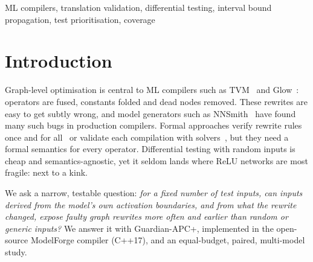 \documentclass[conference]{IEEEtran}
\begin{document}
\begin{IEEEkeywords}
ML compilers, translation validation, differential testing, interval bound propagation, test prioritisation, coverage
\end{IEEEkeywords}

\section{Introduction}
Graph-level optimisation is central to ML compilers such as TVM~\cite{tvm} and Glow~\cite{glow}: operators are fused, constants folded and dead nodes removed. These rewrites are easy to get subtly wrong, and model generators such as NNSmith~\cite{nnsmith} have found many such bugs in production compilers. Formal approaches verify rewrite rules once and for all~\cite{tensorright} or validate each compilation with solvers~\cite{necula,pnueli,alive2}, but they need a formal semantics for every operator. Differential testing with random inputs is cheap and semantics-agnostic, yet it seldom lands where ReLU networks are most fragile: next to a kink.

We ask a narrow, testable question: \emph{for a fixed number of test inputs, can inputs derived from the model's own activation boundaries, and from what the rewrite changed, expose faulty graph rewrites more often and earlier than random or generic inputs?} We answer it with Guardian-APC+, implemented in the open-source ModelForge compiler (C++17), and an equal-budget, paired, multi-model study.
\end{document}
